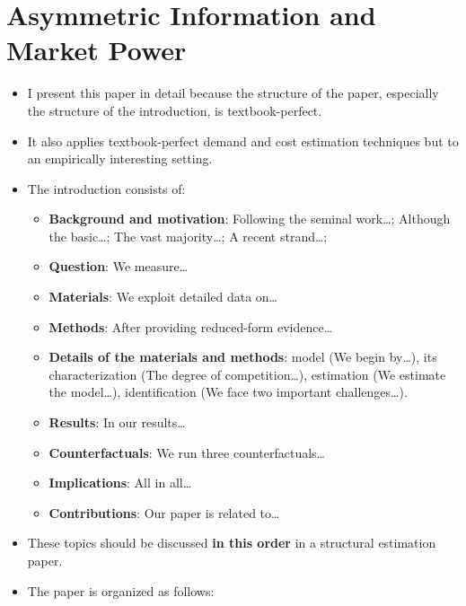 \documentclass[
]{book}
\providecommand{\tightlist}{%
  \setlength{\itemsep}{0pt}\setlength{\parskip}{0pt}}
\begin{document}
\hypertarget{asymmetric-information-and-market-power}{%
\section{Asymmetric Information and Market Power}\label{asymmetric-information-and-market-power}}

\begin{itemize}
\tightlist
\item
  I present this paper in detail because the structure of the paper, especially the structure of the introduction, is textbook-perfect.
\item
  It also applies textbook-perfect demand and cost estimation techniques but to an empirically interesting setting.
\item
  The introduction consists of:

  \begin{itemize}
  \tightlist
  \item
    \textbf{Background and motivation}: Following the seminal work\ldots; Although the basic\ldots; The vast majority\ldots; A recent strand\ldots;
  \item
    \textbf{Question}: We measure\ldots{}
  \item
    \textbf{Materials}: We exploit detailed data on\ldots{}
  \item
    \textbf{Methods}: After providing reduced-form evidence\ldots{}
  \item
    \textbf{Details of the materials and methods}: model (We begin by\ldots), its characterization (The degree of competition\ldots), estimation (We estimate the model\ldots), identification (We face two important challenges\ldots).
  \item
    \textbf{Results}: In our results\ldots{}
  \item
    \textbf{Counterfactuals}: We run three counterfactuals\ldots{}
  \item
    \textbf{Implications}: All in all\ldots{}
  \item
    \textbf{Contributions}: Our paper is related to\ldots{}
  \end{itemize}
\item
  These topics should be discussed \textbf{in this order} in a structural estimation paper.
\item
  The paper is organized as follows:


\end{itemize}
\end{document}
